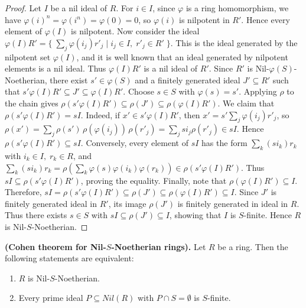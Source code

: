 \documentclass[11pt]{article}
\begin{document}
\begin{proof}
Let $I$ be a nil ideal of $R$. For $i\in I$, since $\varphi$ is a ring homomorphism, we have $\varphi(i)^n=\varphi(i^n)=\varphi(0)=0$,
so $\varphi(i)$ is nilpotent in $R'$. Hence every element of $\varphi(I)$ is nilpotent. Now consider the ideal $\varphi(I)R'=\Big\{\;\sum_{j}\varphi(i_j)r'_j \;\Big|\; i_j\in I,\; r'_j\in R'\;\Big\}$.
This is the ideal generated by the nilpotent set $\varphi(I)$, and it is well known that an ideal generated by nilpotent elements is a nil ideal. Thus $\varphi(I)R'$ is a nil ideal of $R'$. Since $R'$ is Nil-$\varphi(S)$-Noetherian, there exist $s'\in \varphi(S)$ and a finitely generated ideal $J'\subseteq R'$ such that $s'\varphi(I)R'\subseteq J' \subseteq \varphi(I)R'$. Choose $s\in S$ with $\varphi(s)=s'$. Applying $\rho$ to the chain gives $\rho(s'\varphi(I)R') \subseteq \rho(J') \subseteq \rho(\varphi(I)R')$. We claim that $\rho(s'\varphi(I)R')=sI$.  
Indeed, if $x'\in s'\varphi(I)R'$, then $x'=s'\sum_j\varphi(i_j)r'_j$, so $\rho(x')=\sum_j \rho(s')\,\rho(\varphi(i_j))\,\rho(r'_j)
= \sum_j s i_j \rho(r'_j)\in sI$. Hence $\rho(s'\varphi(I)R')\subseteq sI$. Conversely, every element of $sI$ has the form $\sum_k (s i_k) r_k$ with $i_k\in I,\; r_k\in R$, and
$\sum_k (s i_k) r_k = \rho\!\left(\sum_k \varphi(s)\varphi(i_k)\varphi(r_k)\right)\in \rho(s'\varphi(I)R')$. Thus $sI\subseteq \rho(s'\varphi(I)R')$, proving the equality. Finally, note that $\rho(\varphi(I)R')\subseteq I$. Therefore, $sI=\rho(s'\varphi(I)R') \subseteq \rho(J') \subseteq \rho(\varphi(I)R')\subseteq I$. Since $J'$ is finitely generated ideal in $R'$, its image $\rho(J')$ is finitely generated in ideal in $R$. Thus there exists $s\in S$ with $sI\subseteq \rho(J')\subseteq I$, showing that $I$ is $S$-finite. Hence $R$ is Nil-$S$-Noetherian.

\end{proof}

\begin{theorem} \label{cohen}\textbf{(Cohen theorem for Nil-$S$-Noetherian rings).}
Let $R$ be a ring. Then the following statements are equivalent:
\begin{enumerate}
    \item $R$ is Nil-$S$-Noetherian. 
    \item Every prime ideal $P \subseteq Nil(R)$ with $P \cap S = \emptyset$ is $S$-finite.
\end{enumerate}
\end{theorem}
\end{document}
